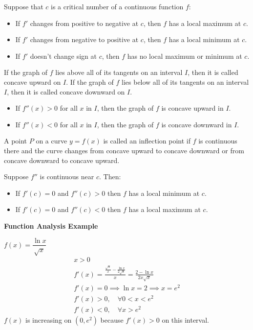 \documentclass{article}
\newcommand{\vem}{\vspace{0.5em}}
\newcommand{\theorem}[2]{\begin{tcolorbox}[title={#1},colback=blue!5!white,colframe=blue!75!black,parbox=false] #2 \end{tcolorbox}}
\begin{document}
\theorem{ The First Derivative Test } {
    Suppose that $c$ is a critical number of a continuous function $f$:
    \begin{itemize}
        \item If $f'$ changes from positive to negative at $c$, then $f$ has a local maximum at $c$.
        \item If $f'$ changes from negative to positive at $c$, then $f$ has a local minimum at $c$.
        \item If $f'$ doesn't change sign at $c$, then $f$ has no local maximum or minimum at $c$.
    \end{itemize}
}

\theorem{ Definition of Concavity } {
    If the graph of $f$ lies above all of its tangents on an interval $I$, then it is called concave upward on $I$. If the graph of $f$ lies below all of its tangents on an interval $I$, then it is called concave downward on $I$.
}

\theorem{ Concavity Test } {
    \begin{itemize}
        \item If $f''(x) > 0$ for all $x$ in $I$, then the graph of $f$ is concave upward in $I$.
        \item If $f''(x) < 0$ for all $x$ in $I$, then the graph of $f$ is concave downward in $I$.
    \end{itemize}
}

\theorem{ Inflection Point } {
    A point $P$ on a curve $y=f(x)$ is called an inflection point if $f$ is continuous there and the curve changes from concave upward to concave downward or from concave downward to concave upward.
}

\theorem{ The Second Derivative Test } {
    Suppose $f''$ is continuous near $c$. Then:
    \begin{itemize}
        \item If $f'(c) = 0$ and $f''(c) > 0$ then $f$ has a local minimum at $c$.
        \item If $f'(c) = 0$ and $f''(c) < 0$ then $f$ has a local maximum at $c$.
    \end{itemize}
}

\textbf{Function Analysis Example} \vem

$f(x)=\dfrac{\ln x}{\sqrt{x}}$
\begin{gather*}
    x>0\\
    f'(x)=\frac{\frac{\sqrt{x}}{x}-\frac{\ln x}{2\sqrt{x}}}{x}=\frac{2-\ln x}{2x\sqrt{x}}\\
    f'(x)=0\implies \ln x=2\implies x=e^2\\
    f'(x)>0, \quad \forall 0<x <e^2\\
    f'(x)<0, \quad \forall x >e^2
\end{gather*}
$f(x)$ is increasing on $(0, e^2)$ because $f'(x)>0$ on this interval.\vem
\end{document}
